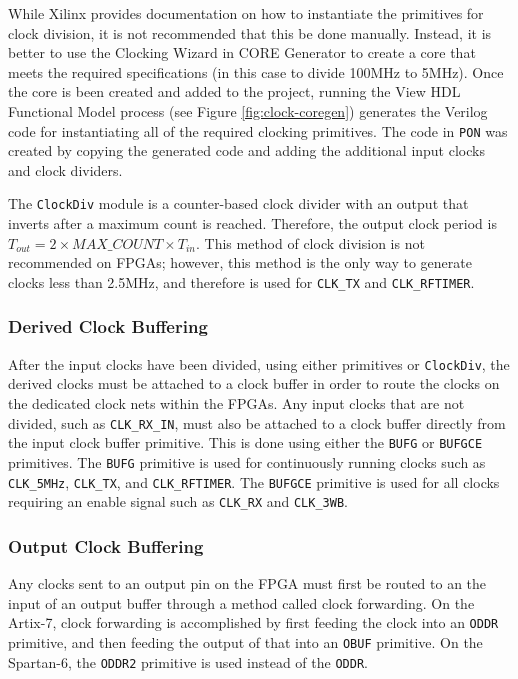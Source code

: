 While Xilinx provides documentation on how to instantiate the primitives for clock division, it is not recommended that this be done manually. Instead, it is better to use the Clocking Wizard in CORE Generator to create a core that meets the required specifications (in this case to divide 100MHz to 5MHz). Once the core is been created and added to the project, running the View HDL Functional Model process (see Figure \ref{fig:clock-coregen}) generates the Verilog code for instantiating all of the required clocking primitives. The code in \texttt{PON} was created by copying the generated code and adding the additional input clocks and clock dividers.

The \texttt{ClockDiv} module is a counter-based clock divider with an output that inverts after a maximum count is reached. Therefore, the output clock period is $ T_{out} = 2 \times MAX\_COUNT \times T_{in} $. This method of clock division is not recommended on FPGAs; however, this method is the only way to generate clocks less than 2.5MHz, and therefore is used for \texttt{CLK\_TX} and \texttt{CLK\_RFTIMER}.

\subsubsection{Derived Clock Buffering}
After the input clocks have been divided, using either primitives or \texttt{ClockDiv}, the derived clocks must be attached to a clock buffer in order to route the clocks on the dedicated clock nets within the FPGAs. Any input clocks that are not divided, such as \texttt{CLK\_RX\_IN}, must also be attached to a clock buffer directly from the input clock buffer primitive. This is done using either the \texttt{BUFG} or \texttt{BUFGCE} primitives. The \texttt{BUFG} primitive is used for continuously running clocks such as \texttt{CLK\_5MHz}, \texttt{CLK\_TX}, and \texttt{CLK\_RFTIMER}. The \texttt{BUFGCE} primitive is used for all clocks requiring an enable signal such as \texttt{CLK\_RX} and \texttt{CLK\_3WB}.

\subsubsection{Output Clock Buffering}
Any clocks sent to an output pin on the FPGA must first be routed to an the input of an output buffer through a method called clock forwarding. On the Artix-7, clock forwarding is accomplished by first feeding the clock into an \texttt{ODDR} primitive, and then feeding the output of that into an \texttt{OBUF} primitive. On the Spartan-6, the \texttt{ODDR2} primitive is used instead of the \texttt{ODDR}.


